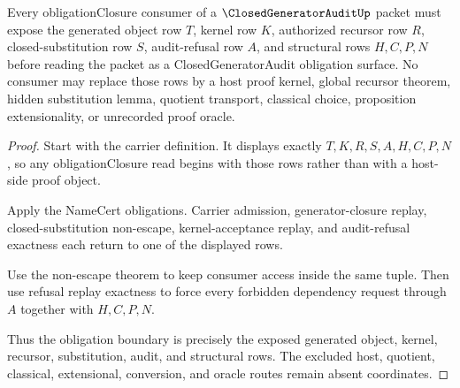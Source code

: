 \begin{theorem}
\label{thm:closed-generator-audit-obligation-boundary}
Every obligationClosure consumer of a $\ClosedGeneratorAuditUp$ packet must expose the generated object row $T$, kernel row $K$, authorized recursor row $R$, closed-substitution row $S$, audit-refusal row $A$, and structural rows $H,C,P,N$ before reading the packet as a ClosedGeneratorAudit obligation surface. No consumer may replace those rows by a host proof kernel, global recursor theorem, hidden substitution lemma, quotient transport, classical choice, proposition extensionality, or unrecorded proof oracle.
\end{theorem}
\begin{proof}
Start with the carrier definition. It displays exactly $T,K,R,S,A,H,C,P,N$, so any obligationClosure read begins with those rows rather than with a host-side proof object.

Apply the NameCert obligations. Carrier admission, generator-closure replay, closed-substitution non-escape, kernel-acceptance replay, and audit-refusal exactness each return to one of the displayed rows.

Use the non-escape theorem to keep consumer access inside the same tuple. Then use refusal replay exactness to force every forbidden dependency request through $A$ together with $H,C,P,N$.

Thus the obligation boundary is precisely the exposed generated object, kernel, recursor, substitution, audit, and structural rows. The excluded host, quotient, classical, extensional, conversion, and oracle routes remain absent coordinates.
\end{proof}

